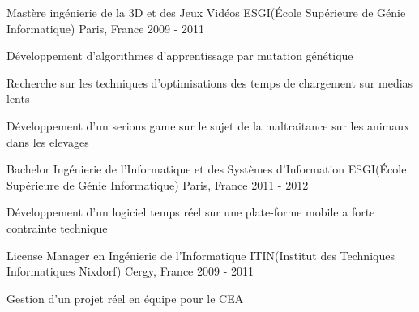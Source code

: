 

\begin{cventries}
  \cventry
    {Mastère ingénierie de la 3D et des Jeux Vidéos} %
    {ESGI(École Supérieure de Génie Informatique)} %
    {Paris, France} %
    {2009 - 2011} %
    {
      \begin{cvitems} %
        \item {Développement d'algorithmes d'apprentissage par mutation génétique}
        \item {Recherche sur les techniques d'optimisations des temps de chargement sur medias lents}
        \item {Développement d'un serious game sur le sujet de la maltraitance sur les animaux dans les elevages}
      \end{cvitems}
    }

  \cventry
    {Bachelor Ingénierie de l'Informatique et des Systèmes d'Information} %
    {ESGI(École Supérieure de Génie Informatique)} %
    {Paris, France} %
    {2011 - 2012} %
    {
      \begin{cvitems} %
        \item {Développement d'un logiciel temps réel sur une plate-forme mobile a forte contrainte technique}
      \end{cvitems}
    }

  \cventry
    {License Manager en Ingénierie de l’Informatique} %
    {ITIN(Institut des Techniques Informatiques Nixdorf)} %
    {Cergy, France} %
    {2009 - 2011} %
    {
      \begin{cvitems} %
        \item {Gestion d'un projet réel en équipe pour le CEA}
      \end{cvitems}
    }

\end{cventries}

